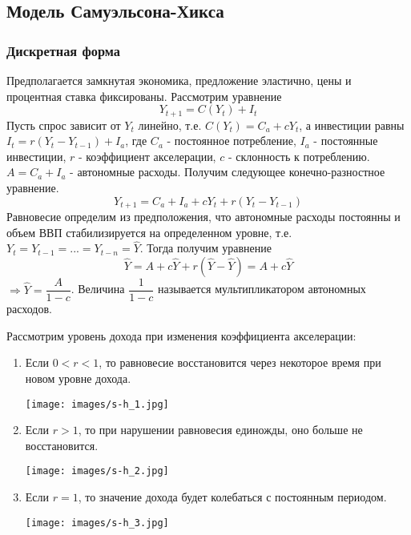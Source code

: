 \subsection{Модель Самуэльсона-Хикса}
\subsubsection{Дискретная форма}
Предполагается замкнутая экономика, предложение эластично, цены и процентная ставка фиксированы.
Рассмотрим уравнение
\begin{equation}
  Y_{t+1}=C(Y_t)+I_t
\end{equation}
Пусть спрос зависит от $Y_t$ линейно, т.е. $C(Y_t)=C_a+cY_t$, а инвестиции равны $I_t=r(Y_t-Y_{t-1}) +I_a$, где
$C_a$ - постоянное потребление, $I_a$ - постоянные инвестиции, $r$ - коэффициент акселерации, $c$ - склонность к потреблению.
 $A=C_a+I_a$ - автономные расходы. Получим следующее конечно-разностное уравнение.
 \begin{equation}
   Y_{t+1}=C_a+I_a + cY_t + r(Y_t-Y_{t-1})
 \end{equation}
 Равновесие определим из предположения, что автономные расходы постоянны и объем ВВП стабилизируется на определенном уровне, т.е.
 $Y_t=Y_{t-1}=...=Y_{t-n}=\widehat{Y}$. Тогда получим уравнение
 \begin{equation}
   \widehat{Y}=A + c\widehat{Y} + r(\widehat{Y}-\widehat{Y})=A+c\widehat{Y}
 \end{equation}
 $\Rightarrow \widehat{Y}=\dfrac{A}{1-c}$. Величина $\dfrac{1}{1-c}$ называется мультипликатором автономных расходов.

Рассмотрим уровень дохода при изменения коэффициента акселерации:
\begin{enumerate}


\item Если $0<r<1$, то равновесие восстановится через некоторое время при новом уровне дохода.\\
    \begin{center}
      \texttt{[image: images/s-h\_1.jpg]}
    \end{center}
\item Если $r>1$, то при нарушении равновесия единожды, оно больше не восстановится.\\
  \begin{center}
    \texttt{[image: images/s-h\_2.jpg]}
  \end{center}
\item Если $r=1$, то значение дохода будет колебаться с постоянным периодом.\\
  \begin{center}
    \texttt{[image: images/s-h\_3.jpg]}
  \end{center}
\end{enumerate}
